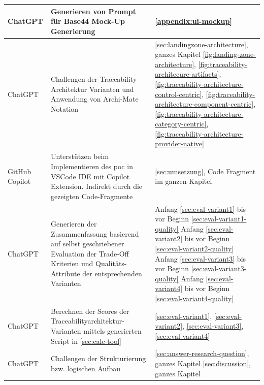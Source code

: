 \begin{longtable}{|
  L{3cm}|
  p{\dimexpr(\textwidth-3cm-6\arrayrulewidth)/2}|
  p{\dimexpr(\textwidth-3cm-6\arrayrulewidth)/2}|
}
    ChatGPT &
    Generieren von Prompt für Base44 Mock-Up Generierung & 
    \autoref{appendix:ui-mockup}
    \\
    \hline
    

    ChatGPT &
    Challengen der Traceability-Architektur Varianten und Anwendung von Archi-Mate Notation & 
    \autoref{sec:landingzone-architecture}, ganzes Kapitel \newline
    \autoref{fig:landing-zone-architecture}, \autoref{fig:traceability-architecure-artifacts}, \autoref{fig:traceability-architecture-control-centric}, \autoref{fig:traceability-architecture-component-centric}, \autoref{fig:traceability-architecture-category-centric}, \autoref{fig:traceability-architecture-provider-native}
    \\
    \hline

    GitHub Copilot &
    Unterstützen beim Implementieren des \ac{poc} in VSCode IDE mit Copilot Extension. Indirekt durch die gezeigten Code-Fragmente & 
    \autoref{sec:umsetzung}, Code Fragment im ganzen Kapitel
    \\
    \hline

    ChatGPT &
    Generieren der Zusammenfassung basierend auf selbst geschriebener Evaluation der Trade-Off Kriterien und Qualitäts-Attribute der entsprechenden Varianten & 
    Anfang \autoref{sec:eval-variant1} bis vor Beginn \autoref{sec:eval-variant1-quality} \newline
    Anfang \autoref{sec:eval-variant2} bis vor Beginn \autoref{sec:eval-variant2-quality} \newline
    Anfang \autoref{sec:eval-variant3} bis vor Beginn \autoref{sec:eval-variant3-quality} \newline
    Anfang \autoref{sec:eval-variant4} bis vor Beginn \autoref{sec:eval-variant4-quality} \newline
    \\
    \hline

    ChatGPT &
    Berechnen der Scores der Traceabilityarchitektur-Varianten mittels generierten Script in \autoref{sec:calc-tool} & 
    \autoref{sec:eval-variant1}, \autoref{sec:eval-variant2}, \autoref{sec:eval-variant3}, \autoref{sec:eval-variant4} \newline
    \\
    \hline

    ChatGPT &
    Challengen der Strukturierung bzw. logischen Aufbau & 
    \autoref{sec:answer-research-question}, ganzes Kapitel \newline
    \autoref{sec:discussion}, ganzes Kapitel
    \\
    \hline


\end{longtable}
